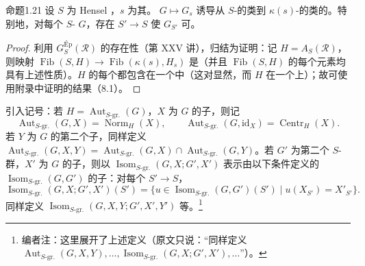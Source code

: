 \begin{SGAresult}{命题}{1.21}
设 $S$ 为 Hensel ，$s$ 为其。 $G\mapsto G_s$ 诱导从 $S$-的类到 $\kappa(s)$-的类的。特别地，对每个 $S$- $G$，存在 $S'\to S$ 使 $G_{S'}$ 可。
\end{SGAresult}
\begin{proof}
利用 $G^{\mathrm{Ép}}_S(\mathcal R)$ 的存在性（第 XXV 讲），归结为证明：记 $H=A_S(\mathcal R)$，则映射 $\operatorname{Fib}(S,H)\to\operatorname{Fib}(\kappa(s),H_s)$
是（并且 $\operatorname{Fib}(S,H)$ 的每个元素均具有上述性质）。$H$ 的每个都包含在一个中（这对显然，而 $H$ 在一个上）；故可使用附录中证明的结果（8.1）。
\end{proof}
引入记号：若 $H=\operatorname{Aut}_{S\text{-gr.}}(G)$，$X$ 为 $G$ 的子，则记
\[\operatorname{Aut}_{S\text{-gr.}}(G,X)=\operatorname{Norm}_H(X),\qquad\operatorname{Aut}_{S\text{-gr.}}(G,\mathrm{id}_X)=\operatorname{Centr}_H(X).\]
若 $Y$ 为 $G$ 的第二个子，同样定义 $\operatorname{Aut}_{S\text{-gr.}}(G,X,Y)=\operatorname{Aut}_{S\text{-gr.}}(G,X)\cap\operatorname{Aut}_{S\text{-gr.}}(G,Y)$。若 $G'$ 为第二个 $S$-群，$X'$ 为 $G$ 的子，则以 $\operatorname{Isom}_{S\text{-gr.}}(G,X;G',X')$ 表示由以下条件定义的 $\operatorname{Isom}_{S\text{-gr.}}(G,G')$ 的子：对每个 $S'\to S$，
\[\operatorname{Isom}_{S\text{-gr.}}(G,X;G',X')(S')=\{u\in\operatorname{Isom}_{S\text{-gr.}}(G,G')(S')\mid u(X_{S'})=X'_{S'}\}.\]
同样定义 $\operatorname{Isom}_{S\text{-gr.}}(G,X,Y;G',X',Y')$ 等。\footnote[11]{编者注：这里展开了上述定义（原文只说：“同样定义 $\operatorname{Aut}_{S\text{-gr.}}(G,X,Y),\ldots,\operatorname{Isom}_{S\text{-gr.}}(G,X;G',X'),\ldots$”）。}
